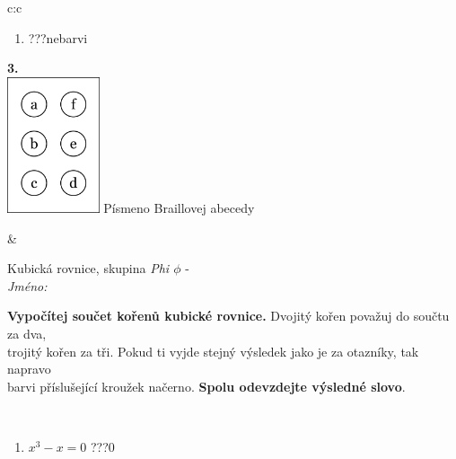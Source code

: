 \documentclass[10pt]{report}
\begin{document}
\begin{tabular}{c:c}
\begin{minipage}[c][104.5mm][t]{0.5\linewidth}
\begin{center}
\begin{minipage}{0.79\linewidth}
\begin{center}
\begin{varwidth}{\linewidth}
\begin{enumerate}
\item \quad \dotfill\; ???\;\dotfill \quad nebarvi
\end{enumerate}
\end{varwidth}
\end{center}
\end{minipage}
\begin{minipage}{0.20\linewidth}
\begin{center}
{\Huge\bfseries 3.} \\[2mm]
\includegraphics[height=40mm]{../images/braille.png}
{\small Písmeno Braillovej abecedy}
\end{center}
\end{minipage}
\end{center}
\end{minipage}
&
\begin{minipage}[c][104.5mm][t]{0.5\linewidth}
\begin{center}
\vspace{7mm}
{\huge Kubická rovnice, skupina \textit{Phi $\phi$} -}\\[5mm]
\textit{Jméno:}\phantom{xxxxxxxxxxxxxxxxxxxxxxxxxxxxxxxxxxxxxxxxxxxxxxxxxxxxxxxxxxxxxxxxx}\\[5mm]
\begin{minipage}{0.95\linewidth}
\begin{center}
\textbf{Vypočítej součet kořenů kubické rovnice.} Dvojitý kořen považuj do součtu za dva,\\trojitý kořen za tři. Pokud ti vyjde stejný výsledek jako je za otazníky, tak napravo\\barvi příslušející kroužek načerno. \textbf{Spolu odevzdejte výsledné slovo}.
\end{center}
\end{minipage}
\\[1mm]
\begin{minipage}{0.79\linewidth}
\begin{center}
\begin{varwidth}{\linewidth}
\begin{enumerate}
\Large
\item $x^3-x=0$\quad \dotfill\; ???\;\dotfill \quad $0$

\end{enumerate}
\end{varwidth}
\end{center}
\end{minipage}
\end{center}
\end{minipage}
\end{tabular}
\end{document}
